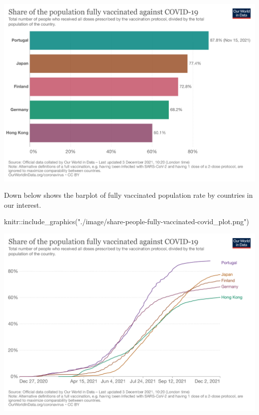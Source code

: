 \documentclass[
]{article}
\newenvironment{Shaded}{\begin{snugshade}}{\end{snugshade}}
\newcommand{\FunctionTok}[1]{\textcolor[rgb]{0.00,0.00,0.00}{#1}}
\newcommand{\NormalTok}[1]{#1}
\newcommand{\SpecialCharTok}[1]{\textcolor[rgb]{0.00,0.00,0.00}{#1}}
\newcommand{\StringTok}[1]{\textcolor[rgb]{0.31,0.60,0.02}{#1}}
\begin{document}
\includegraphics{./image/share-people-fully-vaccinated-covid_bar.png}

Down below shows the barplot of fully vaccinated population rate by
countries in our interest.

\begin{Shaded}
\begin{Highlighting}[]
\NormalTok{knitr}\SpecialCharTok{::}\FunctionTok{include\_graphics}\NormalTok{(}\StringTok{"./image/share{-}people{-}fully{-}vaccinated{-}covid\_plot.png"}\NormalTok{)}
\end{Highlighting}
\end{Shaded}

\includegraphics{./image/share-people-fully-vaccinated-covid_plot.png}

\newpage
\end{document}
